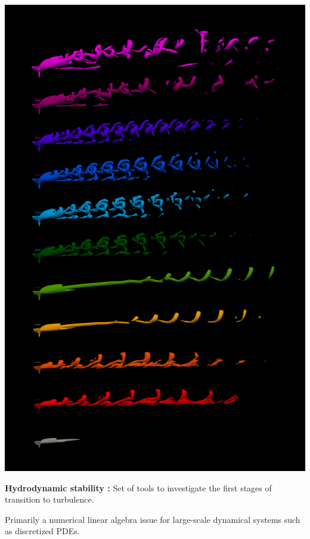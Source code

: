 \documentclass[aspectratio=169, usenames, dvipsnames]{beamer}
\begin{document}
\begin{frame}
  \vfill
  \begin{minipage}{.40\textwidth}
    \centering
    \includegraphics[width=\textwidth]{jet_in_xflow}
  \end{minipage}%
  \hfill
  \begin{minipage}{.56\textwidth}
    \textbf{Hydrodynamic stability :} Set of tools to investigate the first stages of transition to turbulence.
    
    \bigskip
    
    Primarily a numerical linear algebra issue for large-scale dynamical systems such as discretized PDEs.
  \end{minipage}
  \vfill
\end{frame}
\end{document}
